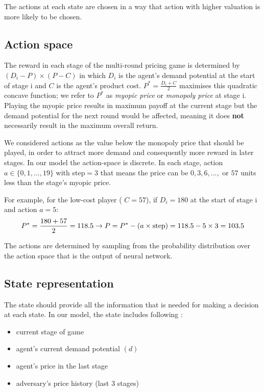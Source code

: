 \documentclass[a4paper,12pt]{article}  %
\theoremstyle{definition}
\begin{document}
	The actions at each state are chosen in a way that action with higher valuation is more likely to be chosen. 
	
	\subsection{Action space} 
	
	The reward in each stage of the multi-round pricing game is determined by $ (D_i-P)\times(P-C) $ in which $ D_i $ is the agent's demand potential at the start of stage i and $ C $ is the agent's product cost. $ P^* = \frac{D_i + C}{2} $ maximises this quadratic concave function; we refer to $ P^* $ as \textit{myopic price} or \textit{monopoly price} at stage i. Playing the myopic price results in maximum payoff at the current stage but the demand potential for the next round would be affected, meaning it does\textbf{ not} necessarily result in the maximum overall return.
	
	We considered actions as the value below the monopoly price that should be played, in order to attract more demand and consequently more reward in later stages. In our model the action-space is discrete. In each stage, action $ a \in \lbrace0, 1, ..., 19\rbrace $ with step$ =3 $ that means the price can be $ 0, 3, 6, ... ,$ or $57 $ units less than the stage's myopic price. 
	
	For example, for the low-cost player ( $ C=57 $), if $ D_i = 180 $ at the start of stage i and action $ a = 5 $:
	\begin{equation*}
		P^* = \frac{180 + 57}{2} = 118.5  \rightarrow P = P^*- ( a\times \text{step}) = 118.5 - 5\times 3 = 103.5 \\
	\end{equation*}

	The actions are determined by sampling from the probability distribution over the action space that is the output of neural network.
	
	\subsection{State representation}
	
	The state should provide all the information that is needed for making a decision at each state. 
	In our model, the state includes following :
	\begin{itemize}
		\item current stage of game 
		\item agent's current demand potential $ (d) $
		\item agent's price in the last stage
		\item adversary's price history (last 3 stages)
	\end{itemize}	
	
\end{document}
